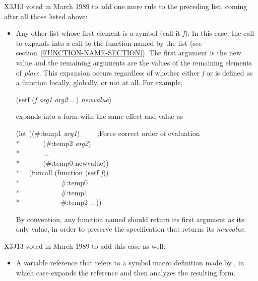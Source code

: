 \begin{defmac}
\begin{newer}
X3J13 voted in March 1989  to add one more rule to
the preceding list, coming after all those listed above:
\begin{itemize}
\item  Any other list whose first element is a symbol (call it \emph{f\/}).
     In this case, the call to  expands into a call to the function
     named by the
     list  (see section~\ref{FUNCTION-NAME-SECTION}).
     The first argument is the new value and the
     remaining arguments are the values of the remaining elements of
     \emph{place}.  This expansion occurs regardless of whether either \emph{f\/} or
      is defined as a function locally, globally, or not at
     all.  For example,
\begin{lisp}
(setf (\emph{f\/} \emph{arg1} \emph{arg2} ...) \emph{newvalue})
\end{lisp}
     expands into a form with the same effect and value as
\begin{lisp}
(let ((\#:temp1 \emph{arg1})~~~~~;\textrm{Force correct order of evaluation} \\*
~~~~~~(\#:temp2 \emph{arg2}) \\*
~~~~~~... \\*
~~~~~~(\#:temp0 newvalue)) \\*
~~(funcall (function (setf \emph{f\/})) \\*
~~~~~~~~~~~\#:temp0 \\*
~~~~~~~~~~~\#:temp1 \\*
~~~~~~~~~~~\#:temp2 ...))
\end{lisp}
By convention, any function named  should return its first
argument as its only value, in order to preserve the specification that
 returns its \emph{newvalue}.
\end{itemize}
\end{newer}

\begin{new}
X3J13 voted in March 1989
 to add this case as well:
\begin{itemize}
\item A variable reference that refers to a symbol macro definition made by
, in which case  expands the reference and
then analyzes the resulting form.
\end{itemize}
\end{new}


\end{defmac}
